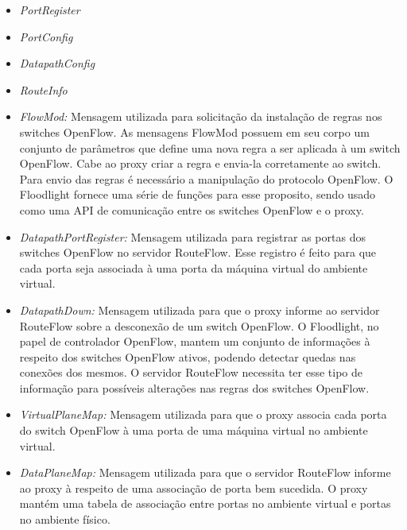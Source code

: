 \begin{itemize}
\item \textit{PortRegister}
\item \textit{PortConfig}
\item \textit{DatapathConfig}
\item \textit{RouteInfo}
\item \textit{FlowMod:} Mensagem utilizada para solicitação da instalação de regras nos switches 
OpenFlow. As mensagens FlowMod possuem em seu corpo um conjunto de parâmetros que define uma nova regra 
a ser aplicada à um switch OpenFlow. Cabe ao proxy criar a regra e envia-la corretamente ao switch. 
Para envio das regras é necessário a manipulação do protocolo OpenFlow. O Floodlight fornece uma série de 
funções para esse proposito, sendo usado como uma API de comunicação entre os switches OpenFlow e o 
proxy.
\item \textit{DatapathPortRegister:} Mensagem utilizada para registrar as portas dos switches OpenFlow 
no servidor RouteFlow. Esse registro é feito para que cada porta seja associada à uma porta da máquina 
virtual do ambiente virtual.
\item \textit{DatapathDown:} Mensagem utilizada para que o proxy informe ao servidor RouteFlow sobre a 
desconexão de um switch OpenFlow. O Floodlight, no papel de controlador OpenFlow, mantem um conjunto de 
informações à respeito dos switches OpenFlow ativos, podendo detectar quedas nas conexões dos mesmos. O 
servidor RouteFlow necessita ter esse tipo de informação para possíveis alterações nas regras dos 
switches OpenFlow.
\item \textit{VirtualPlaneMap:} Mensagem utilizada para que o proxy associa cada porta do switch 
OpenFlow à uma porta de uma máquina virtual no ambiente virtual.
\item \textit{DataPlaneMap:} Mensagem utilizada para que o servidor RouteFlow informe ao proxy à 
respeito de uma associação de porta bem sucedida. O proxy mantém uma tabela de associação entre portas 
no ambiente virtual e portas no ambiente físico.
\end{itemize}

